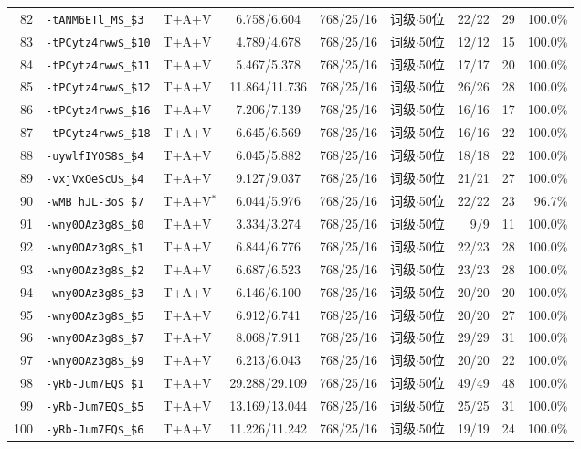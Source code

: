 \begin{longtable}{rllcccrrr}
82 & \texttt{-tANM6ETl\_M\$\_\$3} & T+A+V & 6.758/6.604 & 768/25/16 & 词级$\cdot$50位 & 22/22 & 29 & 100.0\% \\
83 & \texttt{-tPCytz4rww\$\_\$10} & T+A+V & 4.789/4.678 & 768/25/16 & 词级$\cdot$50位 & 12/12 & 15 & 100.0\% \\
84 & \texttt{-tPCytz4rww\$\_\$11} & T+A+V & 5.467/5.378 & 768/25/16 & 词级$\cdot$50位 & 17/17 & 20 & 100.0\% \\
85 & \texttt{-tPCytz4rww\$\_\$12} & T+A+V & 11.864/11.736 & 768/25/16 & 词级$\cdot$50位 & 26/26 & 28 & 100.0\% \\
86 & \texttt{-tPCytz4rww\$\_\$16} & T+A+V & 7.206/7.139 & 768/25/16 & 词级$\cdot$50位 & 16/16 & 17 & 100.0\% \\
87 & \texttt{-tPCytz4rww\$\_\$18} & T+A+V & 6.645/6.569 & 768/25/16 & 词级$\cdot$50位 & 16/16 & 22 & 100.0\% \\
88 & \texttt{-uywlfIYOS8\$\_\$4} & T+A+V & 6.045/5.882 & 768/25/16 & 词级$\cdot$50位 & 18/18 & 22 & 100.0\% \\
89 & \texttt{-vxjVxOeScU\$\_\$4} & T+A+V & 9.127/9.037 & 768/25/16 & 词级$\cdot$50位 & 21/21 & 27 & 100.0\% \\
90 & \texttt{-wMB\_hJL-3o\$\_\$7} & T+A+V$^{*}$ & 6.044/5.976 & 768/25/16 & 词级$\cdot$50位 & 22/22 & 23 & 96.7\% \\
91 & \texttt{-wny0OAz3g8\$\_\$0} & T+A+V & 3.334/3.274 & 768/25/16 & 词级$\cdot$50位 & 9/9 & 11 & 100.0\% \\
92 & \texttt{-wny0OAz3g8\$\_\$1} & T+A+V & 6.844/6.776 & 768/25/16 & 词级$\cdot$50位 & 22/23 & 28 & 100.0\% \\
93 & \texttt{-wny0OAz3g8\$\_\$2} & T+A+V & 6.687/6.523 & 768/25/16 & 词级$\cdot$50位 & 23/23 & 28 & 100.0\% \\
94 & \texttt{-wny0OAz3g8\$\_\$3} & T+A+V & 6.146/6.100 & 768/25/16 & 词级$\cdot$50位 & 20/20 & 20 & 100.0\% \\
95 & \texttt{-wny0OAz3g8\$\_\$5} & T+A+V & 6.912/6.741 & 768/25/16 & 词级$\cdot$50位 & 20/20 & 27 & 100.0\% \\
96 & \texttt{-wny0OAz3g8\$\_\$7} & T+A+V & 8.068/7.911 & 768/25/16 & 词级$\cdot$50位 & 29/29 & 31 & 100.0\% \\
97 & \texttt{-wny0OAz3g8\$\_\$9} & T+A+V & 6.213/6.043 & 768/25/16 & 词级$\cdot$50位 & 20/20 & 22 & 100.0\% \\
98 & \texttt{-yRb-Jum7EQ\$\_\$1} & T+A+V & 29.288/29.109 & 768/25/16 & 词级$\cdot$50位 & 49/49 & 48 & 100.0\% \\
99 & \texttt{-yRb-Jum7EQ\$\_\$5} & T+A+V & 13.169/13.044 & 768/25/16 & 词级$\cdot$50位 & 25/25 & 31 & 100.0\% \\
100 & \texttt{-yRb-Jum7EQ\$\_\$6} & T+A+V & 11.226/11.242 & 768/25/16 & 词级$\cdot$50位 & 19/19 & 24 & 100.0\% \\
\bottomrule
\end{longtable}
\endgroup

\FloatBarrier
